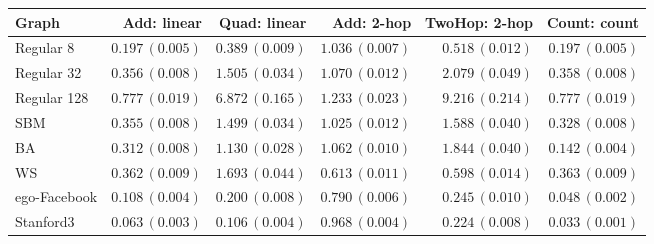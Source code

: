 \begin{tabular}{lrrrrr}\toprule
Graph & Add: linear & Quad: linear & Add: 2-hop & TwoHop: 2-hop & Count: count \\ \midrule
Regular 8 & $0.197\,(0.005)$ & $0.389\,(0.009)$ & $1.036\,(0.007)$ & $0.518\,(0.012)$ & $0.197\,(0.005)$ \\
Regular 32 & $0.356\,(0.008)$ & $1.505\,(0.034)$ & $1.070\,(0.012)$ & $2.079\,(0.049)$ & $0.358\,(0.008)$ \\
Regular 128 & $0.777\,(0.019)$ & $6.872\,(0.165)$ & $1.233\,(0.023)$ & $9.216\,(0.214)$ & $0.777\,(0.019)$ \\
SBM & $0.355\,(0.008)$ & $1.499\,(0.034)$ & $1.025\,(0.012)$ & $1.588\,(0.040)$ & $0.328\,(0.008)$ \\
BA & $0.312\,(0.008)$ & $1.130\,(0.028)$ & $1.062\,(0.010)$ & $1.844\,(0.040)$ & $0.142\,(0.004)$ \\
WS & $0.362\,(0.009)$ & $1.693\,(0.044)$ & $0.613\,(0.011)$ & $0.598\,(0.014)$ & $0.363\,(0.009)$ \\
ego-Facebook & $0.108\,(0.004)$ & $0.200\,(0.008)$ & $0.790\,(0.006)$ & $0.245\,(0.010)$ & $0.048\,(0.002)$ \\
Stanford3 & $0.063\,(0.003)$ & $0.106\,(0.004)$ & $0.968\,(0.004)$ & $0.224\,(0.008)$ & $0.033\,(0.001)$ \\
\bottomrule\end{tabular}